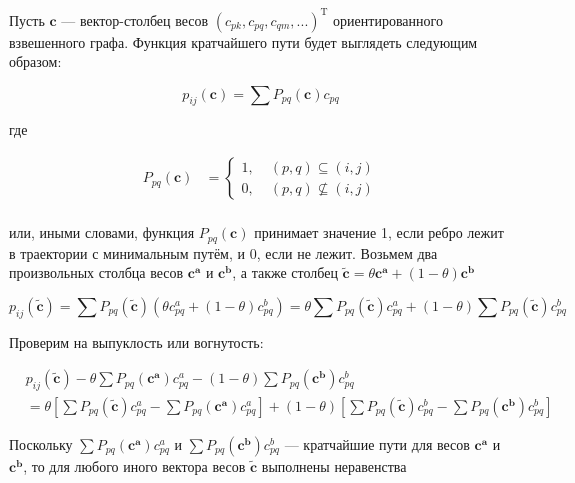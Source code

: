 	Пусть $\mathbf{c}$ --- вектор-столбец весов $(c_{pk}, c_{pq}, c_{qm},
	...)^{\text{T}}$ ориентированного взвешенного графа. Функция кратчайшего пути
	будет выглядеть следующим образом:
	
	\begin{equation}
	p_{ij}(\mathbf{c}) = \sum P_{pq}(\mathbf{c}) c_{pq}
	\end{equation}
	
	где 
	
	
	\begin{align}
	P_{pq}(\mathbf{c}) &=
	\left\{
	\begin{aligned}
	1 ,\; & (p,q) \subseteq (i,j) \\
	0 ,\; & (p,q) \nsubseteq (i,j)
	\end{aligned}
	\right. \\
	\end{align}
	
	или, иными словами, функция $P_{pq}(\mathbf{c})$ принимает значение 1, если
	ребро лежит в траектории с минимальным путём, и 0, если не лежит. Возьмем два
	произвольных столбца весов $\mathbf{c^a}$ и $\mathbf{c^b}$, а также столбец
	$\mathbf{\tilde{c}} = \theta \mathbf{c^a} + (1-\theta)\mathbf{c^b}$
	
	\begin{equation}
	p_{ij}(\mathbf{\tilde{c}}) = \sum P_{pq}(\mathbf{\tilde{c}}) (\theta c_{pq}^a +
	(1 - \theta) c_{pq}^b) = \theta \sum P_{pq}(\mathbf{\tilde{c}}) c_{pq}^a + (1 -
	\theta) \sum P_{pq}(\mathbf{\tilde{c}})  c_{pq}^b 
	\end{equation}
	
	Проверим на выпуклость или вогнутость:
	
	\begin{equation}
	\begin{split}
	&p_{ij}(\mathbf{\tilde{c}}) - \theta \sum P_{pq}(\mathbf{c^a}) c_{pq}^a - (1 -
	\theta) \sum P_{pq}(\mathbf{c^b})  c_{pq}^b \\
	&= \theta \left[ \sum P_{pq}(\mathbf{\tilde{c}}) c_{pq}^a - \sum
	P_{pq}(\mathbf{c^a}) c_{pq}^a \right]  + (1 - \theta) \left[ \sum
	P_{pq}(\mathbf{\tilde{c}}) c_{pq}^b - \sum P_{pq}(\mathbf{c^b}) c_{pq}^b\right] 
	\end{split}
	\end{equation}
	
	Поскольку $\sum P_{pq}(\mathbf{c^a}) c_{pq}^a$ и $\sum P_{pq}(\mathbf{c^b})
	c_{pq}^b$ --- кратчайшие пути для весов $\mathbf{c^a}$ и $\mathbf{c^b}$, то для
	любого иного вектора весов $\mathbf{\tilde{c}}$ выполнены неравенства
	
